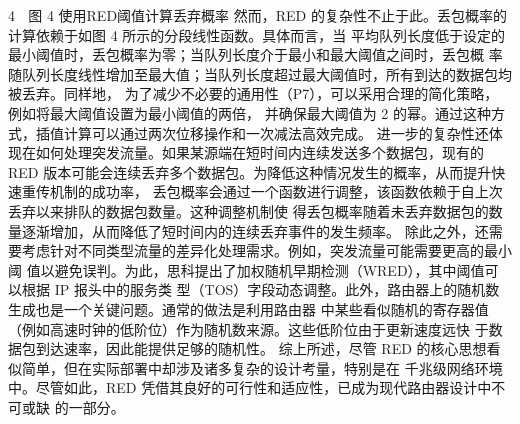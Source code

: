                                                             4
                图 4 使用RED阈值计算丢弃概率
  然而，RED 的复杂性不止于此。丢包概率的计算依赖于如图 4 所示的分段线性函数。具体而言，当
平均队列长度低于设定的最小阈值时，丢包概率为零；当队列长度介于最小和最大阈值之间时，丢包概
率随队列长度线性增加至最大值；当队列长度超过最大阈值时，所有到达的数据包均被丢弃。同样地，
为了减少不必要的通用性（P7），可以采用合理的简化策略，例如将最大阈值设置为最小阈值的两倍，
并确保最大阈值为 2 的幂。通过这种方式，插值计算可以通过两次位移操作和一次减法高效完成。
  进一步的复杂性还体现在如何处理突发流量。如果某源端在短时间内连续发送多个数据包，现有的
RED 版本可能会连续丢弃多个数据包。为降低这种情况发生的概率，从而提升快速重传机制的成功率，
丢包概率会通过一个函数进行调整，该函数依赖于自上次丢弃以来排队的数据包数量。这种调整机制使
得丢包概率随着未丢弃数据包的数量逐渐增加，从而降低了短时间内的连续丢弃事件的发生频率。
  除此之外，还需要考虑针对不同类型流量的差异化处理需求。例如，突发流量可能需要更高的最小阈
值以避免误判。为此，思科提出了加权随机早期检测（WRED），其中阈值可以根据 IP 报头中的服务类
型（TOS）字段动态调整。此外，路由器上的随机数生成也是一个关键问题。通常的做法是利用路由器
中某些看似随机的寄存器值（例如高速时钟的低阶位）作为随机数来源。这些低阶位由于更新速度远快
于数据包到达速率，因此能提供足够的随机性。
  综上所述，尽管 RED 的核心思想看似简单，但在实际部署中却涉及诸多复杂的设计考量，特别是在
千兆级网络环境中。尽管如此，RED 凭借其良好的可行性和适应性，已成为现代路由器设计中不可或缺
的一部分。


